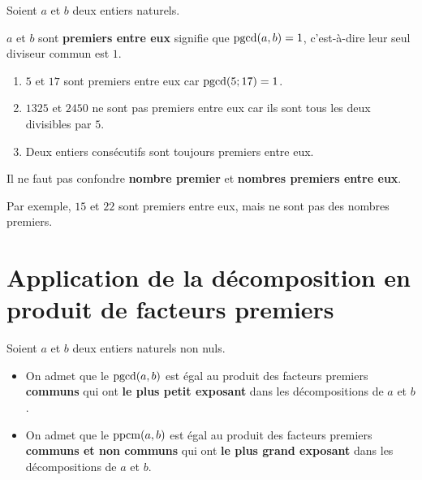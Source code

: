 \documentclass[10pt, a4paper]{article}
\begin{document}
\begin{Definition}
Soient $a$ et $b$ deux entiers naturels.

$a$ et $b$ sont \textbf{premiers entre eux} signifie que $\operatorname{pgcd}(a,b) = 1$,
c'est-à-dire leur seul diviseur commun est $1$.
\end{Definition}


\begin{Exemple}[][5 min]
\begin{enumerate}[leftmargin=*,itemsep=0.5pt]
    \item $5$ et $17$ sont premiers entre eux car $\operatorname{pgcd}(5; 17) = 1$.
    \item $1325$ et $2450$ ne sont pas premiers entre eux car ils sont tous les deux divisibles par $5$.
    \item Deux entiers consécutifs sont toujours premiers entre eux.
\end{enumerate}
\end{Exemple}


\begin{Remarque}
Il ne faut pas confondre \textbf{nombre premier} et \textbf{nombres premiers entre eux}.

Par exemple, $15$ et $22$ sont premiers entre eux, mais ne sont pas des nombres premiers.
\end{Remarque}


\section{Application de la décomposition en produit de facteurs premiers }

\begin{Propriete}[]
Soient $a$ et $b$ deux entiers naturels non nuls.
\begin{itemize}[leftmargin=*,itemsep=0.5pt]
  \item On admet que le $\operatorname{pgcd}(a,b)$ est égal au produit des facteurs premiers \textbf{communs} qui ont \textbf{le plus petit exposant} dans les décompositions de $a$ et $b$.
  \item On admet que le $\operatorname{ppcm}(a,b)$ est égal au produit des facteurs premiers \textbf{communs et non communs} qui ont \textbf{le plus grand exposant} dans les décompositions de $a$ et $b$.
\end{itemize}
\end{Propriete}
\end{document}
